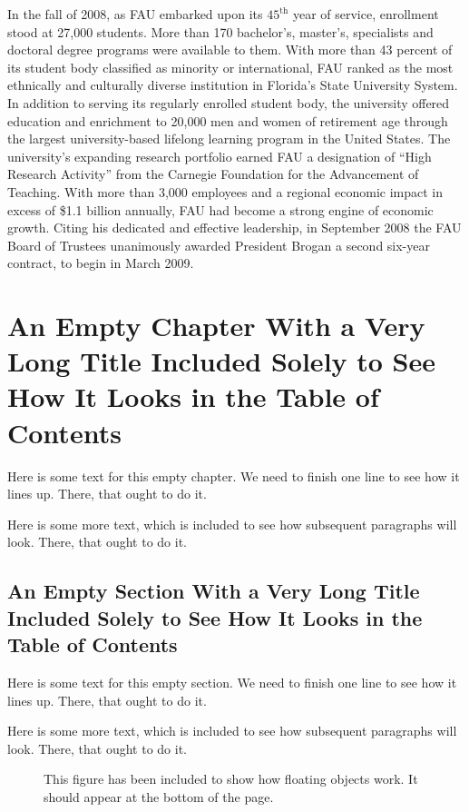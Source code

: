 \documentclass{article}
\begin{document}
In the fall of 2008, as FAU embarked upon its $45^{\mathrm{th}}$ year of service, enrollment stood at 27,000 students.  More than 170 bachelor's, master's, specialists and doctoral degree programs were available to them.  With more than 43 percent of its student body classified as minority or international, FAU ranked as the most ethnically and culturally diverse institution in Florida's State University System.  In addition to serving its regularly enrolled student body, the university offered education and enrichment to 20,000 men and women of retirement age through the largest university-based lifelong learning program in the United States.  The university's expanding research portfolio earned FAU a designation of ``High Research Activity'' from the Carnegie Foundation for the Advancement of Teaching.  With more than 3,000 employees and a regional economic impact in excess of \$1.1 billion annually, FAU had become a strong engine of economic growth.  Citing his dedicated and effective leadership, in September 2008 the FAU Board of Trustees unanimously awarded President Brogan a second six-year contract, to begin in March 2009.


\chapter{An Empty Chapter With a Very Long Title Included Solely to See How It Looks in the Table of Contents}

Here is some text for this empty chapter.  We need to finish one line to see how it lines up.  There, that ought to do it.

Here is some more text, which is included to see how subsequent paragraphs will look.  There, that ought to do it.

\section{An Empty Section With a Very Long Title Included Solely to See How It Looks in the Table of Contents}

Here is some text for this empty section.  We need to finish one line to see how it lines up.  There, that ought to do it.

Here is some more text, which is included to see how subsequent paragraphs will look.  There, that ought to do it.


\begin{figure}[b]
\begin{center}
\parbox{1.0\columnwidth}{\hrulefill{}\quad\hrulefill}
\parbox{0.8\columnwidth}{\hrulefill{}\quad\hrulefill}
\parbox{0.6\columnwidth}{\hrulefill{}\quad\hrulefill}
\parbox{0.4\columnwidth}{\hrulefill{}\quad\hrulefill}
\end{center}
\setlength{}
\caption[A sample figure]{This figure has been included to show how floating objects work.  It should appear at the bottom of the page.}
\end{figure}
\end{document}

